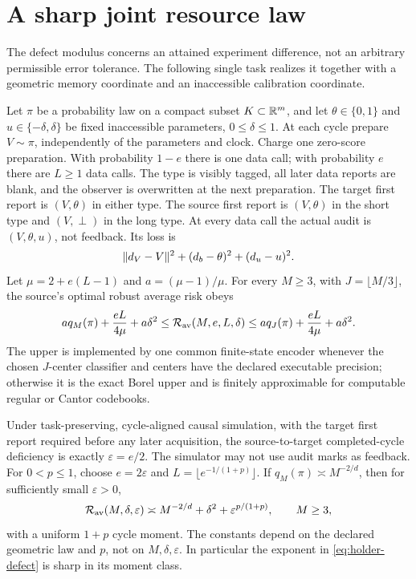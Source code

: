 \section{A sharp joint resource law}\label{sec:sharp}
The defect modulus concerns an attained experiment difference, not an arbitrary permissible error tolerance. The following single task realizes it together with a geometric memory coordinate and an inaccessible calibration coordinate.

\begin{proposition}\label{prop:joint}
Let $\pi$ be a probability law on a compact subset $K\subset\mathbb R^m$, and let $\theta\in\{0,1\}$ and $u\in\{-\delta,\delta\}$ be fixed inaccessible parameters, $0\le\delta\le1$. At each cycle prepare $V\sim\pi$, independently of the parameters and clock. Charge one zero-score preparation. With probability $1-e$ there is one data call; with probability $e$ there are $L\ge1$ data calls. The type is visibly tagged, all later data reports are blank, and the observer is overwritten at the next preparation. The target first report is $(V,\theta)$ in either type. The source first report is $(V,\theta)$ in the short type and $(V,\perp)$ in the long type. At every data call the actual audit is $(V,\theta,u)$, not feedback. Its loss is
\[
 \lVert d_V-V\rVert^2+(d_b-\theta)^2+(d_u-u)^2.
\]
Let $\mu=2+e(L-1)$ and $a=(\mu-1)/\mu$. For every $M\ge3$, with $J=\lfloor M/3\rfloor$, the source's optimal robust average risk obeys
\begin{equation}\label{eq:joint-sandwich}
 a q_M(\pi)+\frac{eL}{4\mu}+a\delta^2
 \le\mathcal R_{\mathrm{av}}(M,e,L,\delta)
 \le a q_J(\pi)+\frac{eL}{4\mu}+a\delta^2.
\end{equation}
The upper is implemented by one common finite-state encoder whenever the chosen $J$-center classifier and centers have the declared executable precision; otherwise it is the exact Borel upper and is finitely approximable for computable regular or Cantor codebooks.

Under task-preserving, cycle-aligned causal simulation, with the target first report required before any later acquisition, the source-to-target completed-cycle deficiency is exactly $\varepsilon=e/2$. The simulator may not use audit marks as feedback. For $0<p\le1$, choose $e=2\varepsilon$ and $L=\lfloor e^{-1/(1+p)}\rfloor$. If $q_M(\pi)\asymp M^{-2/d}$, then for sufficiently small $\varepsilon>0$,
\begin{equation}\label{eq:joint-rate}
 \mathcal R_{\mathrm{av}}(M,\delta,\varepsilon)
 \asymp M^{-2/d}+\delta^2+\varepsilon^{p/(1+p)},\qquad M\ge3,
\end{equation}
with a uniform $1+p$ cycle moment. The constants depend on the declared geometric law and $p$, not on $M,\delta,\varepsilon$. In particular the exponent in \eqref{eq:holder-defect} is sharp in its moment class.


\end{proposition}
